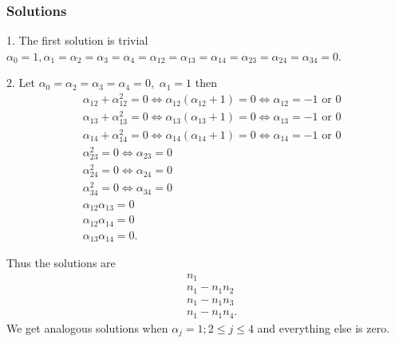 \documentclass[aps,preprint]{revtex4}%
\begin{document}
\subsubsection{Solutions}

1. The first solution is trivial $\alpha_{0}=1,\alpha_{1}=\alpha_{2}%
=\alpha_{3}=\alpha_{4}=\alpha_{12}=\alpha_{13}=\alpha_{14}=\alpha_{23}%
=\alpha_{24}=\alpha_{34}=0.$

2. Let $\alpha_{0}=\alpha_{2}=\alpha_{3}=\alpha_{4}=0,$ $\alpha_{1}=1$ then
\begin{align}
&  \alpha_{12}+\alpha_{12}^{2}=0\Leftrightarrow\alpha_{12}\left(  \alpha
_{12}+1\right)  =0\Leftrightarrow\alpha_{12}=-1\text{ or }0\nonumber\\
&  \alpha_{13}+\alpha_{13}^{2}=0\Leftrightarrow\alpha_{13}\left(  \alpha
_{13}+1\right)  =0\Leftrightarrow\alpha_{13}=-1\text{ or }0\nonumber\\
&  \alpha_{14}+\alpha_{14}^{2}=0\Leftrightarrow\alpha_{14}\left(  \alpha
_{14}+1\right)  =0\Leftrightarrow\alpha_{14}=-1\text{ or }0\nonumber\\
&  \alpha_{23}^{2}=0\Leftrightarrow\alpha_{23}=0\nonumber\\
&  \alpha_{24}^{2}=0\Leftrightarrow\alpha_{24}=0\nonumber\\
&  \alpha_{34}^{2}=0\Leftrightarrow\alpha_{34}=0\nonumber\\
&  \alpha_{12}\alpha_{13}=0\nonumber\\
&  \alpha_{12}\alpha_{14}=0\nonumber\\
&  \alpha_{13}\alpha_{14}=0.\nonumber
\end{align}


Thus the solutions are
\begin{align}
&  n_{1}\\
&  n_{1}-n_{1}n_{2}\\
&  n_{1}-n_{1}n_{3}\\
&  n_{1}-n_{1}n_{4}.
\end{align}
We get analogous solutions when $\alpha_{j}=1;2\leq j\leq4$ and everything
else is zero.
\end{document}
